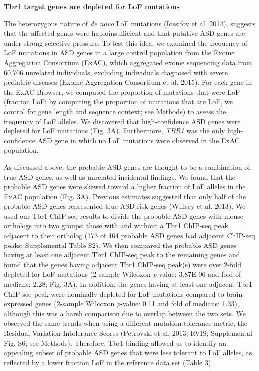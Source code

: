 \documentclass[]{article}
\begin{document}
\textbf{Tbr1 target genes are depleted for LoF mutations}

The heterozygous nature of \emph{de novo} LoF mutations (Iossifov et al.
2014), suggests that the affected genes were haploinsufficient and that
putative ASD genes are under strong selective pressure. To test this
idea, we examined the frequency of LoF mutations in ASD genes in a large
control population from the Exome Aggregation Consortium (ExAC), which
aggregated exome sequencing data from 60,706 unrelated individuals,
excluding individuals diagnosed with severe pediatric diseases (Exome
Aggregation Consortium et al. 2015). For each gene in the ExAC Browser,
we computed the proportion of mutations that were LoF (fraction LoF; by
computing the proportion of mutations that are LoF, we control for gene
length and sequence context; see Methods) to assess the frequency of LoF
alleles. We discovered that high-confidence ASD genes were depleted for
LoF mutations (Fig. 3A). Furthermore, \emph{TBR1} was the only
high-confidence ASD gene in which no LoF mutations were observed in the
ExAC population.

As discussed above, the probable ASD genes are thought to be a
combination of true ASD genes, as well as unrelated incidental findings.
We found that the probable ASD genes were skewed toward a higher
fraction of LoF alleles in the ExAC population (Fig. 3A). Previous
estimates suggested that only half of the probable ASD genes represented
true ASD risk genes (Willsey et al. 2013). We used our Tbr1 ChIP-seq
results to divide the probable ASD genes with mouse orthologs into two
groups: those with and without a Tbr1 ChIP-seq peak adjacent to their
ortholog (173 of 464 probable ASD genes had adjacent ChIP-seq peaks;
Supplemental Table S2). We then compared the probable ASD genes having
at least one adjacent Tbr1 ChIP-seq peak to the remaining genes and
found that the genes having adjacent Tbr1 ChIP-seq peak(s) were over
2-fold depleted for LoF mutations (2-sample Wilcoxon \emph{p}-value:
3.87E-06 and fold of medians: 2.28; Fig. 3A). In addition, the genes
having at least one adjacent Tbr1 ChIP-seq peak were nominally depleted
for LoF mutations compared to brain expressed genes (2-sample Wilcoxon
\emph{p}-value: 0.11 and fold of medians: 1.33), although this was a
harsh comparison due to overlap between the two sets. We observed the
same trends when using a different mutation tolerance metric, the
Residual Variation Intolerance Scores (Petrovski et al. 2013; RVIS;
Supplemental Fig. S6; see Methods). Therefore, Tbr1 binding allowed us
to identify an appealing subset of probable ASD genes that were less
tolerant to LoF alleles, as reflected by a lower fraction LoF in the
reference data set (Table 3).
\end{document}
